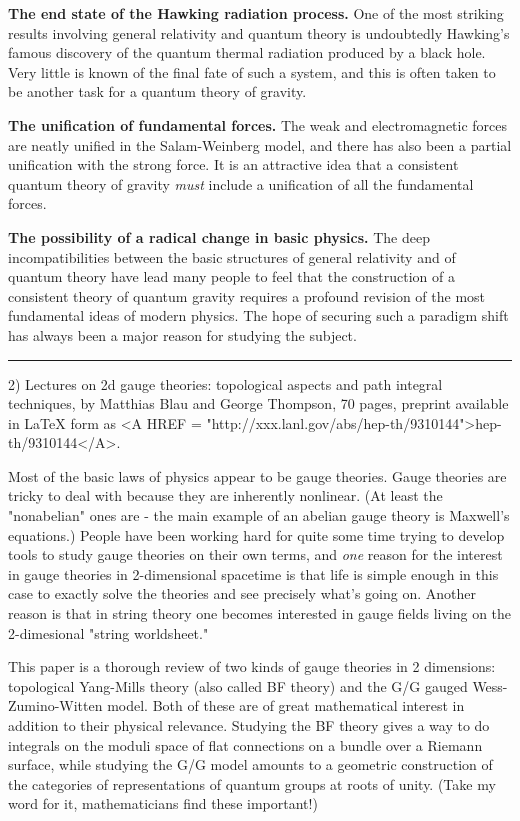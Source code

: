 \textbf{The end state of the Hawking radiation process.}  One of the most
striking results involving general relativity and quantum theory is
undoubtedly Hawking's famous discovery of the quantum thermal radiation
produced by a black hole.  Very little is known of the final fate of such
a system, and this is often taken to be another task for a quantum
theory of gravity.

\textbf{The unification of fundamental forces.}  The weak and electromagnetic
forces are neatly unified in the Salam-Weinberg model, and there has
also been a partial unification with the strong force.  It is an
attractive idea that a consistent quantum theory of gravity \emph{must}
include a unification of all the fundamental forces.

\textbf{The possibility of a radical change in basic physics.}  The deep
incompatibilities between the basic structures of general relativity and
of quantum theory have lead many people to feel that the construction of
a consistent theory of quantum gravity requires a profound revision of
the most fundamental ideas of modern physics.  The hope of securing such
a paradigm shift has always been a major reason for studying the
subject.
\par\noindent\rule{\textwidth}{0.4pt}

2) Lectures on 2d gauge theories: topological aspects and path integral
techniques, by Matthias Blau and George Thompson, 70 pages, preprint
available in LaTeX form as <A HREF = "http://xxx.lanl.gov/abs/hep-th/9310144">hep-th/9310144</A>.

Most of the basic laws of physics appear to be gauge theories.  Gauge
theories are tricky to deal with because they are inherently nonlinear.
(At least the "nonabelian" ones are - the main example of an abelian
gauge theory is Maxwell's equations.)  People have been working hard for
quite some time trying to develop tools to study gauge theories on their
own terms, and \emph{one} reason for the interest in gauge theories in
2-dimensional spacetime is that life is simple enough in this case to
exactly solve the theories and see precisely what's going on.  Another
reason is that in string theory one becomes interested in gauge fields
living on the 2-dimesional "string worldsheet."  

This paper is a thorough review of two kinds of gauge theories in 2
dimensions: topological Yang-Mills theory (also called BF theory) and
the G/G gauged Wess-Zumino-Witten model.  Both of these are of great
mathematical interest in addition to their physical relevance.  Studying
the BF theory gives a way to do integrals on the moduli space of flat
connections on a bundle over a Riemann surface, while studying the G/G
model amounts to a geometric construction of the categories of
representations of quantum groups at roots of unity.  (Take my word for
it, mathematicians find these important!)

